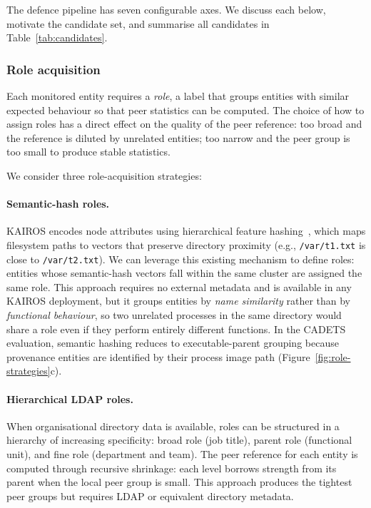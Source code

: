 \documentclass[10pt,twocolumn]{article}
\begin{document}
The defence pipeline has seven configurable axes.  We discuss each below,
motivate the candidate set, and summarise all candidates in
Table~\ref{tab:candidates}.

\subsubsection{Role acquisition}
\label{sec:role-acq}

Each monitored entity requires a \emph{role}, a label that groups entities
with similar expected behaviour so that peer statistics can be computed.
The choice of how to assign roles has a direct effect on the quality of the
peer reference: too broad and the reference is diluted by unrelated entities;
too narrow and the peer group is too small to produce stable statistics.

We consider three role-acquisition strategies:

\paragraph{Semantic-hash roles.}  KAIROS encodes node attributes using
hierarchical feature hashing~\cite{cheng2024kairos}, which maps filesystem
paths to vectors that preserve directory proximity (e.g., \texttt{/var/t1.txt}
is close to \texttt{/var/t2.txt}).  We can leverage this existing mechanism
to define roles: entities whose semantic-hash vectors fall within the same
cluster are assigned the same role.  This approach requires no external
metadata and is available in any KAIROS deployment, but it groups entities
by \emph{name similarity} rather than by \emph{functional behaviour}, so
two unrelated processes in the same directory would share a role even if they
perform entirely different functions.  In the CADETS evaluation, semantic
hashing reduces to executable-parent grouping because provenance entities
are identified by their process image path (Figure~\ref{fig:role-strategies}c).

\paragraph{Hierarchical LDAP roles.}  When organisational directory data
is available, roles can be structured in a hierarchy of increasing
specificity: broad role (job title), parent role (functional unit), and
fine role (department and team).  The peer reference for each entity is
computed through recursive shrinkage: each level borrows strength from
its parent when the local peer group is small.
This approach produces the tightest peer groups but requires LDAP or
equivalent directory metadata.
\end{document}
